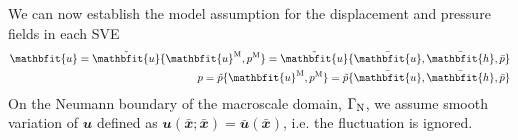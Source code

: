 \documentclass[12pt,a4paper]{article}
\renewcommand{\ta}[1]{\mathbfit{#1}}
\renewcommand{\ts}[1]{\mathbfit{#1}}
\begin{document}
We can now establish the model assumption for the displacement and pressure fields in each SVE
\begin{subequations}
\begin{align}
 \ta u = \tilde{\ta u}\{\ta u^\macro, p^\macro\} = \tilde{\ta u}\{\bar{\ta u}, \bar{\ts h}, \bar{p}\}
\\
 p = \tilde{p}\{\ta u^\macro, p^\macro\} = \tilde{p}\{\bar{\ta u}, \bar{\ts h}, \bar{p}\}
\end{align}
\end{subequations}
On the Neumann boundary of the macroscale domain, $\Gamma_{\mathrm{N}}$, we assume smooth variation of $\ta{u}$ defined as $\ta{u}(\bar{\ta{x}};\bar{\ta{x}})=\bar{\ta{u}}(\bar{\ta{x}})$, i.e. the fluctuation is ignored.
\end{document}
